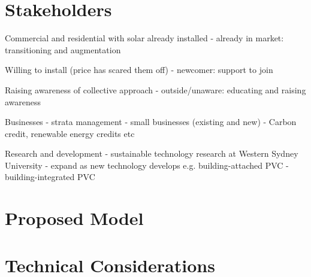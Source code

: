 \documentclass[12pt,twocolumn]{article}
\begin{document}
\section {Stakeholders}

Commercial and residential with solar already installed
- already in market: transitioning and augmentation

Willing to install (price has scared them off)
- newcomer: support to join

Raising awareness of collective approach
- outside/unaware: educating and raising awareness

Businesses
- strata management
- small businesses (existing and new)
- Carbon credit, renewable energy credits etc

Research and development
- sustainable technology research at Western Sydney University
- expand as new technology develops e.g. building-attached PVC - building-integrated PVC

\section {Proposed Model}

\section {Technical Considerations}
\end{document}
